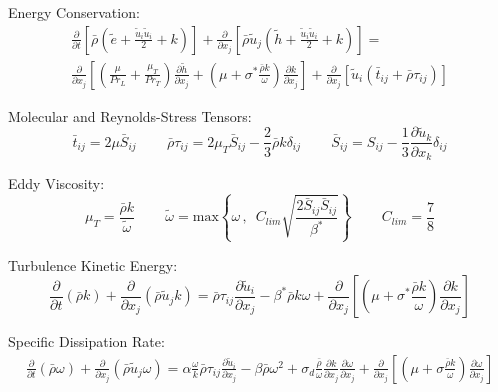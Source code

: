 Energy Conservation:
\begin{eqnarray}
  \frac{\partial}{\partial t} \left[ \bar{\rho} \left( 
  \tilde{e} + \frac{\tilde{u}_i \tilde{u}_i}{2} + k \right) \right] +
  \frac{\partial}{\partial x_j} \left[ \bar{\rho} \tilde{u}_j \left( 
  \tilde{h} + \frac{\tilde{u}_i \tilde{u}_i}{2} + k \right) \right] = \nonumber \\
  \frac{\partial}{\partial x_j} \left[ 
  \left( \frac{\mu}{Pr_L} + \frac{\mu_T}{Pr_T} \right) 
  \frac{\partial \tilde{h}}{\partial x_j}  + 
  \left( \mu + \sigma^{\ast} \frac{\bar{\rho}k}{\omega} \right) 
  \frac{\partial k}{\partial x_j} \right] +
  \frac{\partial}{\partial x_j} \left[ \tilde{u}_i \left( 
  \bar{t}_{ij} + \bar{\rho}\tau_{ij} \right) \right]
\end{eqnarray}

Molecular and Reynolds-Stress Tensors:
\begin{equation}
\bar{t}_{ij} = 2 \mu \bar{S}_{ij} 
\, \, \, \, \, \, \, \, \, \, \, \, \,
\bar{\rho} \tau_{ij} = 2 \mu_T \bar{S}_{ij} - \frac{2}{3} \bar{\rho} k \delta_{ij}
\, \, \, \, \, \, \, \, \, \, \, \, \,
\bar{S}_{ij} = S_{ij} - \frac{1}{3}\frac{\partial \tilde{u}_k}{\partial x_k} \delta_{ij}
\end{equation}

Eddy Viscosity:
\begin{equation}
\mu_T = \frac{\bar{\rho} k}{\tilde{\omega}}
\, \, \, \, \, \, \, \, \, \, \, \, \,
\tilde{\omega} = \textrm{max} \left \{ \omega \, , \, \, \,
C_{lim} \sqrt{\frac{2 \bar{S}_{ij} \bar{S}_{ij}}{\beta^\ast}} \right \}
\, \, \, \, \, \, \, \, \, \, \, \, \,
C_{lim} = \frac{7}{8}
\end{equation}

Turbulence Kinetic Energy:
\begin{equation}
\frac{\partial}{\partial t} \left( \bar{\rho} k \right) +
\frac{\partial}{\partial x_j} \left( \bar{\rho} \tilde{u}_j k \right) =
\bar{\rho} \tau_{ij} \frac{\partial \tilde{u}_i}{\partial x_j} -
\beta^{\ast}\bar{\rho}k\omega + \frac{\partial}{\partial x_j} 
\left[ \left( \mu + \sigma^{\ast} \frac{\bar{\rho} k}{\omega} \right) 
\frac{\partial k}{\partial x_j}  \right]
\end{equation}

Specific Dissipation Rate:
\begin{eqnarray}
\frac{\partial}{\partial t} \left( \bar{\rho} \omega \right) +
\frac{\partial}{\partial x_j} \left( \bar{\rho} \tilde{u}_j \omega \right) =
\alpha \frac{\omega}{k} \bar{\rho} \tau_{ij} \frac{\partial \tilde{u}_i}{\partial x_j} -
\beta \bar{\rho} \omega^2 +
\sigma_d \frac{\bar{\rho}}{\omega} 
\frac{\partial k}{\partial x_j} \frac{\partial \omega}{\partial x_j} +
\frac{\partial}{\partial x_j} 
\left[ \left( \mu + \sigma \frac{\bar{\rho} k}{\omega} \right) 
\frac{\partial \omega}{\partial x_j}  \right]
\end{eqnarray}

